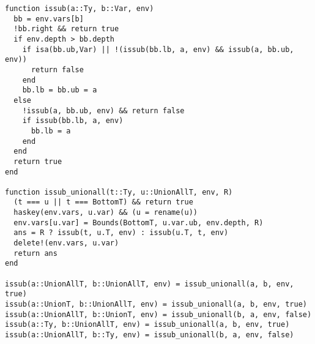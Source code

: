 \begin{singlespace}
\begin{lstlisting}[style=customjulia]
function issub(a::Ty, b::Var, env)
  bb = env.vars[b]
  !bb.right && return true
  if env.depth > bb.depth
    if isa(bb.ub,Var) || !(issub(bb.lb, a, env) && issub(a, bb.ub, env))
      return false
    end
    bb.lb = bb.ub = a
  else
    !issub(a, bb.ub, env) && return false
    if issub(bb.lb, a, env)
      bb.lb = a
    end
  end
  return true
end

function issub_unionall(t::Ty, u::UnionAllT, env, R)
  (t === u || t === BottomT) && return true
  haskey(env.vars, u.var) && (u = rename(u))
  env.vars[u.var] = Bounds(BottomT, u.var.ub, env.depth, R)
  ans = R ? issub(t, u.T, env) : issub(u.T, t, env)
  delete!(env.vars, u.var)
  return ans
end

issub(a::UnionAllT, b::UnionAllT, env) = issub_unionall(a, b, env, true)
issub(a::UnionT, b::UnionAllT, env) = issub_unionall(a, b, env, true)
issub(a::UnionAllT, b::UnionT, env) = issub_unionall(b, a, env, false)
issub(a::Ty, b::UnionAllT, env) = issub_unionall(a, b, env, true)
issub(a::UnionAllT, b::Ty, env) = issub_unionall(b, a, env, false)

\end{lstlisting}
\end{singlespace}
